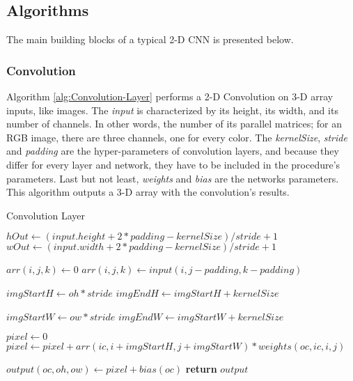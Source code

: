 \subsection{Algorithms}
The main building blocks of a typical 2-D CNN is presented below.

\subsubsection{Convolution}
Algorithm \ref{alg:Convolution-Layer} performs a 2-D Convolution on 3-D array inputs, like images. The \textit{input} is characterized by its height, its width, and its number of channels. In other words, the number of its parallel matrices; for an RGB image, there are three channels, one for every color. The \textit{kernelSize}, \textit{stride} and \textit{padding} are the hyper-parameters of convolution layers, and because they differ for every layer and network, they have to be included in the procedure's parameters. Last but not least, \textit{weights} and \textit{bias} are the networks parameters. This algorithm outputs a 3-D array with the convolution's results.

\begin{algorithm}[H]
	\caption{Convolution Layer}\label{alg:Convolution-Layer}
	\begin{algorithmic}[1]
			\State $hOut \gets (input.height +2 * padding - kernelSize) / stride + 1$
			\State $wOut \gets (input.width +2 * padding - kernelSize) / stride + 1$

							\State $arr(i, j, k) \gets 0$
						\Else{}
							\State $arr(i, j, k) \gets input(i, j - padding, k - padding)$
						\EndIf
					\EndFor
				\EndFor
			\EndFor

			 
					\State $imgStartH \gets oh * stride$
					\State $imgEndH \gets imgStartH + kernelSize$

						\State $imgStartW \gets ow * stride$
						\State $imgEndW \gets imgStartW + kernelSize$

						\State $pixel \gets 0$
									\State $pixel \gets pixel + arr(ic, i + imgStartH, j + imgStartW) * weights(oc, ic, i, j)$
								\EndFor
							\EndFor
						\EndFor

						\State $output(oc, oh, ow) \gets pixel + bias(oc)$
					\EndFor
				\EndFor
			\EndFor
			\State \textbf{return} $output$
		\EndProcedure
	\end{algorithmic}
\end{algorithm}

